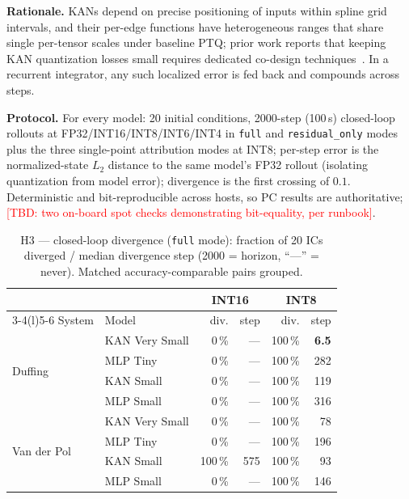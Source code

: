\documentclass[conference]{IEEEtran}
\newcommand{\tbd}[1]{\textcolor{red}{[TBD: #1]}}
\begin{document}
\textbf{Rationale.} KANs depend on precise positioning of inputs within
spline grid intervals, and their per-edge functions have heterogeneous ranges
that share single per-tensor scales under baseline PTQ; prior work reports
that keeping KAN quantization losses small requires dedicated co-design
techniques~\cite{huang2025hardware}. In a recurrent integrator, any such
localized error is fed back and compounds across steps.

\textbf{Protocol.} For every model: 20 initial conditions, 2000-step
(100\,s) closed-loop rollouts at FP32/INT16/INT8/INT6/INT4 in \texttt{full}
and \texttt{residual\_only} modes plus the three single-point attribution
modes at INT8; per-step error is the normalized-state $L_2$ distance to the
same model's FP32 rollout (isolating quantization from model error);
divergence is the first crossing of $0.1$. Deterministic and bit-reproducible
across hosts, so PC results are authoritative;
\tbd{two on-board spot checks demonstrating bit-equality, per runbook}.

\begin{table}[t]
\centering
\caption{H3 --- closed-loop divergence (\texttt{full} mode): fraction of 20
ICs diverged / median divergence step (2000 = horizon, ``---'' = never).
Matched accuracy-comparable pairs grouped.}
\label{tab:dependability}
\small
\setlength{\tabcolsep}{4.2pt}
\begin{tabular}{llrrrr}
\toprule
& & \multicolumn{2}{c}{INT16} & \multicolumn{2}{c}{INT8} \\
\cmidrule(lr){3-4}\cmidrule(l){5-6}
System & Model & div. & step & div. & step \\
\midrule
\multirow{4}{*}{Duffing}
 & KAN Very Small & 0\,\%   & --- & 100\,\% & \textbf{6.5} \\
 & MLP Tiny       & 0\,\%   & --- & 100\,\% & 282 \\
 & KAN Small      & 0\,\%   & --- & 100\,\% & 119 \\
 & MLP Small      & 0\,\%   & --- & 100\,\% & 316 \\
\midrule
\multirow{4}{*}{Van der Pol}
 & KAN Very Small & 0\,\%   & --- & 100\,\% & 78 \\
 & MLP Tiny       & 0\,\%   & --- & 100\,\% & 196 \\
 & KAN Small      & 100\,\% & 575 & 100\,\% & 93 \\
 & MLP Small      & 0\,\%   & --- & 100\,\% & 146 \\
\bottomrule
\end{tabular}
\end{table}
\end{document}
